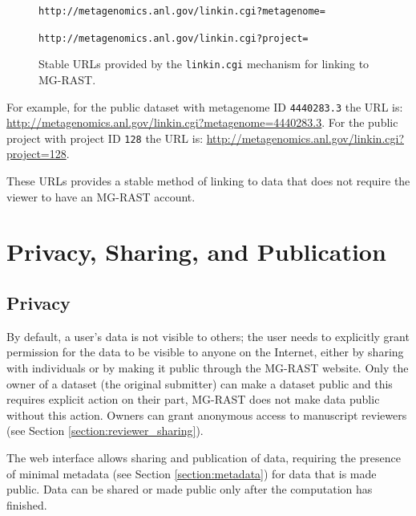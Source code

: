 \documentclass[12pt,fullpage]{report}
\begin{document}
\begin{figure}[ht]

\texttt{http://metagenomics.anl.gov/linkin.cgi?metagenome=}

\texttt{http://metagenomics.anl.gov/linkin.cgi?project=}

\caption{Stable URLs provided by the \texttt{linkin.cgi} mechanism for linking to MG-RAST.}
\label{fig:linkin.cgi}

\end{figure}

For example, for the public dataset with metagenome ID \texttt{4440283.3} the URL is:
\url{http://metagenomics.anl.gov/linkin.cgi?metagenome=4440283.3}.
For the public project with project ID  \texttt{128} the URL is:
\url{http://metagenomics.anl.gov/linkin.cgi?project=128}.

These URLs provides a stable method of linking to data that does not require the viewer to have an MG-RAST account. 
\section{Privacy, Sharing, and Publication}
\subsection{Privacy}
By default, a user's data is not visible to others; the user needs to explicitly grant permission for the data to be visible to anyone on the Internet, either by sharing with individuals or by making it public through the MG-RAST website. Only the owner of a dataset (the original submitter) can make a dataset public and this requires explicit action on their part, MG-RAST does not make data public without this action.
Owners can grant anonymous access to manuscript reviewers  (see Section \ref{section:reviewer_sharing}).

The web interface allows sharing and publication of data, requiring the presence of minimal metadata
(see Section \ref{section:metadata}) for data that is made public. 
Data can be shared or made public only after the computation has finished.
\end{document}
